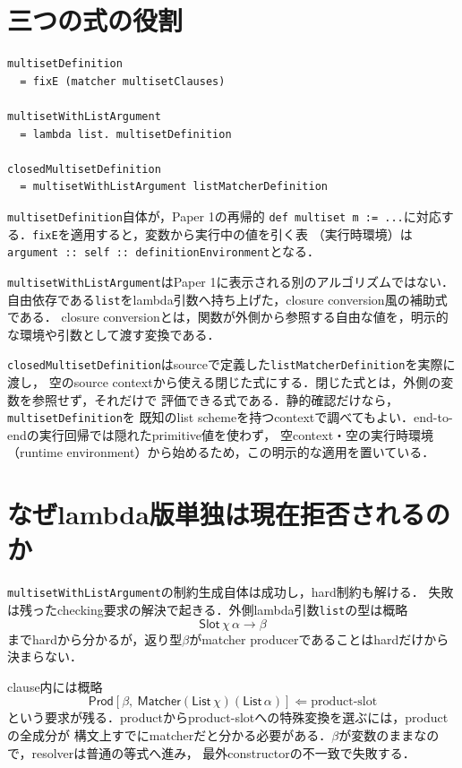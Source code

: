 \documentclass[11pt,a4paper,oneside]{ltjsbook}
\newcommand{\code}[1]{\texttt{#1}}
\newcommand{\checks}{\mathrel{\Leftarrow}}
\newcommand{\Matcher}{\mathsf{Matcher}}
\newcommand{\Slot}{\mathsf{Slot}}
\newcommand{\Prod}{\mathsf{Prod}}
\newcommand{\fn}{\mathbin{\to}}
\begin{document}
\section{三つの式の役割}

\begin{lstlisting}
multisetDefinition
  = fixE (matcher multisetClauses)

multisetWithListArgument
  = lambda list. multisetDefinition

closedMultisetDefinition
  = multisetWithListArgument listMatcherDefinition
\end{lstlisting}

\code{multisetDefinition}自体が，Paper 1の再帰的
\code{def multiset m := ...}に対応する．\code{fixE}を適用すると，変数から実行中の値を引く表
（実行時環境）は
\code{argument :: self :: definitionEnvironment}となる．

\code{multisetWithListArgument}はPaper 1に表示される別のアルゴリズムではない．
自由依存である\code{list}をlambda引数へ持ち上げた，closure conversion風の補助式である．
closure conversionとは，関数が外側から参照する自由な値を，明示的な環境や引数として渡す変換である．

\code{closedMultisetDefinition}はsourceで定義した\code{listMatcherDefinition}を実際に渡し，
空のsource contextから使える閉じた式にする．閉じた式とは，外側の変数を参照せず，それだけで
評価できる式である．静的確認だけなら，\code{multisetDefinition}を
既知のlist schemeを持つcontextで調べてもよい．end-to-endの実行回帰では隠れたprimitive値を使わず，
空context・空の実行時環境（runtime environment）から始めるため，この明示的な適用を置いている．

\section{なぜlambda版単独は現在拒否されるのか}

\code{multisetWithListArgument}の制約生成自体は成功し，hard制約も解ける．
失敗は残ったchecking要求の解決で起きる．外側lambda引数\code{list}の型は概略
\[
  \Slot\,\chi\,\alpha \fn \beta
\]
までhardから分かるが，返り型$\beta$がmatcher producerであることはhardだけから決まらない．

clause内には概略
\[
  \Prod[\beta,\ \Matcher(\mathsf{List}\,\chi)(\mathsf{List}\,\alpha)]
  \checks \text{product-slot}
\]
という要求が残る．productからproduct-slotへの特殊変換を選ぶには，productの全成分が
構文上すでにmatcherだと分かる必要がある．$\beta$が変数のままなので，resolverは普通の等式へ進み，
最外constructorの不一致で失敗する．
\end{document}
